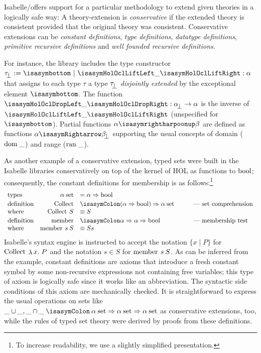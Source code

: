 Isabelle/\HOL offers support for a particular methodology to extend
given theories in a logically safe way: A theory-extension is
\emph{conservative} if the extended theory is consistent provided that
the original theory was consistent.  Conservative extensions can be
\emph{constant definitions}, \emph{type definitions}, \emph{datatype
  definitions}, \emph{primitive recursive definitions} and
\emph{well founded recursive definitions}.

For instance, the library includes the type constructor $\up{\tau} :=
\isasymbottom ~ | ~ \lift{\_} : \alpha$ that assigns to each type
$\tau$ a type $\up{\tau}$ \emph{disjointly extended} by the
exceptional element $\isasymbottom$. The function $\drop{\_} :
\up{\alpha} \to \alpha$ is the inverse of $\lift{\_}$ (unspecified for
$\isasymbottom$). Partial functions $\alpha \isasymrightharpoonup
\beta$ are defined as functions $\alpha \isasymRightarrow \up{\beta}$
supporting the usual concepts of domain ($\mathrm{dom}\;\_$) and range
($\mathrm{ran}\;\_$).

As another example of a conservative extension, typed sets were built
in the Isabelle libraries conservatively on top of the kernel of HOL
as functions to $\mathrm{bool}$; consequently, the constant definitions
for membership is as follows:\footnote{To increase readability, we use
  a slightly simplified presentation.}
\begin{gather}
  \begin{array}{lrll}
    \types& \alpha \HolSet            &= \alpha \Rightarrow \HolBoolean\\[.5ex]
    \isardef &\operatorname{Collect}&\ofType (\alpha \Rightarrow
     \HolBoolean) \Rightarrow \HolSet{\alpha}  &\qquad\text{--- set comprehension}\\
    \where &\operatorname{Collect}\ap S      &\equiv S\\[.5ex]
     \isardef &\operatorname{member}           &\ofType \alpha \Rightarrow
     \alpha \Rightarrow \HolBoolean &\qquad\text{---
       membership test}\\
     \where &\operatorname{member}\ap s\ap S &\equiv S s\\
  \end{array}
\end{gather}
Isabelle's syntax engine is instructed to accept the notation
$\{x \mid P\}$ for $\operatorname{Collect}\ap\lambda x\spot P$ and the
notation $s \in S$ for $\operatorname{member}\: s\: S$. As can be
inferred from the example, constant definitions are axioms that
introduce a fresh constant symbol by some non-recursive expressions not 
containing free variables; this type of axiom is logically safe since it works
like an abbreviation. The syntactic side conditions of this axiom are
mechanically checked. It is straightforward to express the
usual operations on sets like $\_ \cup \_,
\_\cap\_\ofType\HolSet{\alpha} \Rightarrow \HolSet{\alpha} \Rightarrow
\HolSet{\alpha}$ as conservative extensions, too, while the rules of
typed set theory were derived by proofs from these definitions.

